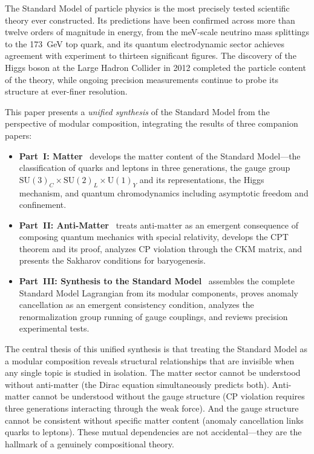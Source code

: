\documentclass[12pt]{article}
\theoremstyle{definition}
\theoremstyle{remark}
\newcommand{\su}[1]{\mathrm{SU}(#1)}
\newcommand{\uu}[1]{\mathrm{U}(#1)}
\begin{document}
The Standard Model of particle physics is the most precisely tested scientific theory ever constructed. Its predictions have been confirmed across more than twelve orders of magnitude in energy, from the meV-scale neutrino mass splittings to the 173~GeV top quark, and its quantum electrodynamic sector achieves agreement with experiment to thirteen significant figures. The discovery of the Higgs boson at the Large Hadron Collider in 2012 completed the particle content of the theory, while ongoing precision measurements continue to probe its structure at ever-finer resolution.

This paper presents a \emph{unified synthesis} of the Standard Model from the perspective of modular composition, integrating the results of three companion papers:

\begin{itemize}
\item \textbf{Part~I: Matter}~\cite{PartI} develops the matter content of the Standard Model---the classification of quarks and leptons in three generations, the gauge group $\su{3}_C \times \su{2}_L \times \uu{1}_Y$ and its representations, the Higgs mechanism, and quantum chromodynamics including asymptotic freedom and confinement.

\item \textbf{Part~II: Anti-Matter}~\cite{PartII} treats anti-matter as an emergent consequence of composing quantum mechanics with special relativity, develops the CPT theorem and its proof, analyzes CP violation through the CKM matrix, and presents the Sakharov conditions for baryogenesis.

\item \textbf{Part~III: Synthesis to the Standard Model}~\cite{PartIII} assembles the complete Standard Model Lagrangian from its modular components, proves anomaly cancellation as an emergent consistency condition, analyzes the renormalization group running of gauge couplings, and reviews precision experimental tests.
\end{itemize}

The central thesis of this unified synthesis is that treating the Standard Model as a modular composition reveals structural relationships that are invisible when any single topic is studied in isolation. The matter sector cannot be understood without anti-matter (the Dirac equation simultaneously predicts both). Anti-matter cannot be understood without the gauge structure (CP violation requires three generations interacting through the weak force). And the gauge structure cannot be consistent without specific matter content (anomaly cancellation links quarks to leptons). These mutual dependencies are not accidental---they are the hallmark of a genuinely compositional theory.
\end{document}
